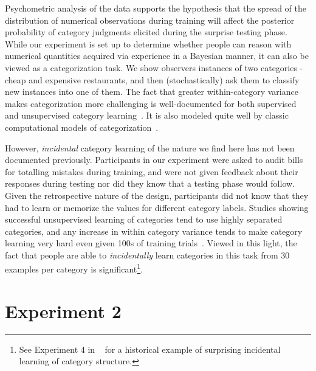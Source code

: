 \documentclass[10pt,letterpaper]{article}
\begin{document}
Psychometric analysis of the data supports the hypothesis that the spread of the distribution of numerical observations during training will affect the posterior probability of category judgments elicited during the surprise testing phase. While our experiment is set up to determine whether people can reason with numerical quantities acquired via experience in a Bayesian manner, it can also be viewed as a categorization task. We show observers instances of two categories - cheap and expensive restaurants, and then (stochastically) ask them to classify new instances into one of them. The fact that greater within-category variance makes categorization more challenging is well-documented for both supervised~\cite{alfonso2002makes} and unsupervised category learning~\cite{kloos2008s}. It is also modeled quite well by classic computational models of categorization~\cite{fried1984induction, anderson1991adaptive}. 

However, {\em incidental} category learning of the nature we find here has not been documented previously. Participants in our experiment were asked to audit bills for totalling mistakes during training, and were not given feedback about their responses during testing nor did they know that a testing phase would follow. Given the retrospective nature of the design, participants did not know that they had to learn or memorize the values for different category labels. Studies showing successful unsupervised learning of categories tend to use highly separated categories, and any increase in within category variance tends to make category learning very hard even given 100s of training trials~\cite{ell2012impact}. Viewed in this light, the fact that people are able to {\em incidentally} learn categories in this task from 30 examples per category is significant\footnote{See Experiment 4 in ~ for a historical example of surprising incidental learning of category structure.}.



\section{Experiment 2}

\end{document}

